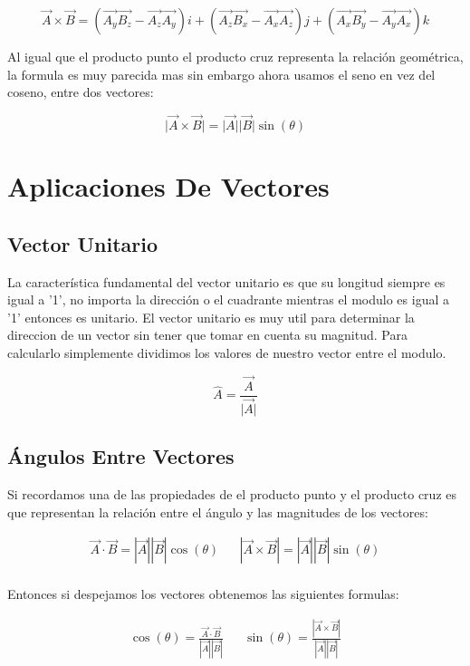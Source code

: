 \documentclass{article}
\begin{document}
\[
\vec{A} \times \vec{B} = 
  (\vec{A_y}\vec{B_z} - \vec{A_z}\vec{A_y})i + 
  (\vec{A_z}\vec{B_x} - \vec{A_x}\vec{A_z})j + 
  (\vec{A_x}\vec{B_y} - \vec{A_y}\vec{A_x})k
\]

Al igual que el producto punto el producto cruz representa la relación geométrica, la formula es muy parecida mas sin embargo ahora usamos el seno en vez del coseno, entre dos vectores:

\[
\vert \vec{A}\times\vec{B}\vert = \vert\vec{A}\vert\vert\vec{B}\vert \sin(\theta)
\]

\section{Aplicaciones De Vectores}
\label{sec:org5cea960}
\subsection{Vector Unitario}
\label{sec:org61a8f14}
La característica fundamental del vector unitario es que su longitud siempre es igual a '1', no importa la dirección o el cuadrante mientras el modulo es igual a '1' entonces es unitario. El vector unitario es muy util para determinar la direccion de un vector sin tener que tomar en cuenta su magnitud. Para calcularlo simplemente dividimos los valores de nuestro vector entre el modulo.

\[ 
\hat{A} = \frac{\vec{A}}{\vert\vec{A}\vert} 
\]

\subsection{Ángulos Entre Vectores}
\label{sec:org9fcd8c6}
Si recordamos una de las propiedades de el producto punto y el producto cruz es que representan la relación entre el ángulo y las magnitudes de los vectores:

\[ \begin{aligned}
 \vec{A}\cdot\vec{B} = |\vec{A}||\vec{B}| \cos(\theta) && |\vec{A}\times\vec{B}| = |\vec{A}||\vec{B}| \sin(\theta) \\
\end{aligned} \]

Entonces si despejamos los vectores obtenemos las siguientes formulas:

\[ \begin{aligned}
\cos(\theta) = \frac{\vec{A} \cdot \vec{B}}{|\vec{A}||\vec{B}|} &&
\sin(\theta) = \frac{|\vec{A}\times\vec{B}|}{|\vec{A}||\vec{B}|} \\
\end{aligned} \]
\end{document}

